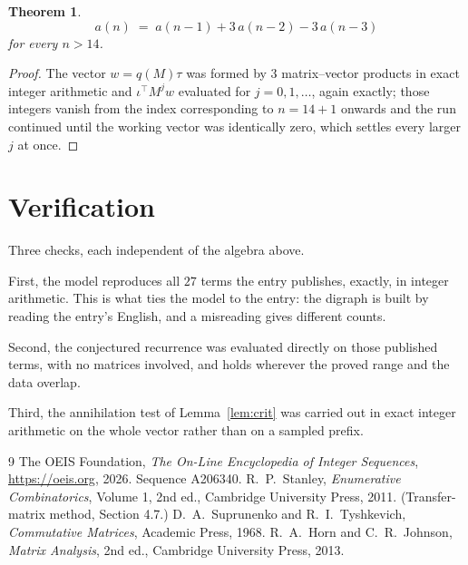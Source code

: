\documentclass[11pt,a4paper]{article}
\theoremstyle{plain}
\newtheorem{theorem}{Theorem}
\theoremstyle{definition}
\begin{document}
\begin{theorem}
\[
a(n)\;=\;a(n-1) + 3\,a(n-2) - 3\,a(n-3)
\]
for every $n>14$.
\end{theorem}

\begin{proof}
The vector $w=q(M)\tau$ was formed by $3$ matrix--vector products in exact integer
arithmetic and $\iota^{\!\top}M^{j}w$ evaluated for $j=0,1,\dots$, again exactly; those
integers vanish from the index corresponding to $n=14+1$ onwards and the run continued
until the working vector was identically zero, which settles every larger $j$ at once.
\end{proof}

\section{Verification}

Three checks, each independent of the algebra above.

First, the model reproduces all $27$ terms the entry publishes, exactly, in integer
arithmetic. This is what ties the model to the entry: the digraph is built by reading the
entry's English, and a misreading gives different counts.

Second, the conjectured recurrence was evaluated directly on those published terms, with no
matrices involved, and holds wherever the proved range and the data overlap.

Third, the annihilation test of Lemma~\ref{lem:crit} was carried out in exact integer
arithmetic on the whole vector rather than on a sampled prefix.

\begin{thebibliography}{9}
 The OEIS Foundation, \emph{The On-Line Encyclopedia of Integer
Sequences}, \url{https://oeis.org}, 2026. Sequence A206340.
 R.~P.~Stanley, \emph{Enumerative Combinatorics}, Volume 1, 2nd ed.,
Cambridge University Press, 2011. (Transfer-matrix method, Section 4.7.)
 D.~A.~Suprunenko and R.~I.~Tyshkevich, \emph{Commutative Matrices},
Academic Press, 1968.
 R.~A.~Horn and C.~R.~Johnson, \emph{Matrix Analysis}, 2nd ed., Cambridge
University Press, 2013.
\end{thebibliography}
\end{document}

